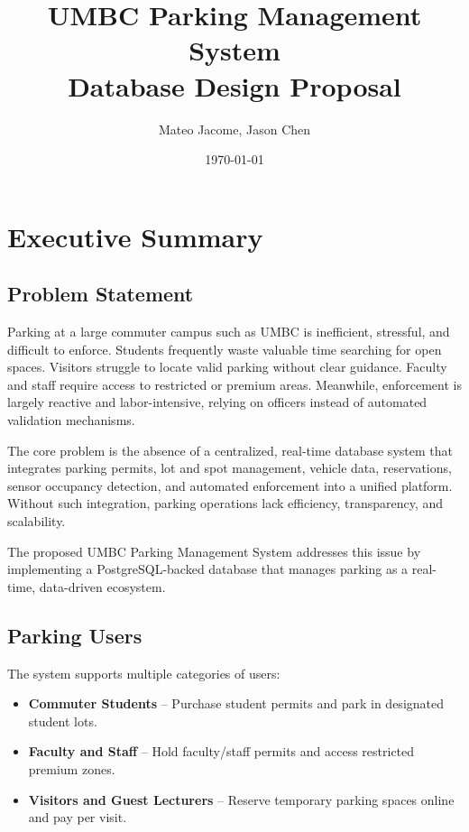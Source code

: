 \documentclass[12pt]{report}
\title{UMBC Parking Management System\\Database Design Proposal}
\author{Mateo Jacome, Jason Chen}
\date{\today}
\begin{document}
\maketitle

\tableofcontents
\newpage

\section{Executive Summary}


\subsection{Problem Statement}

Parking at a large commuter campus such as UMBC is inefficient, stressful, and difficult to enforce. Students frequently waste valuable time searching for open spaces. Visitors struggle to locate valid parking without clear guidance. Faculty and staff require access to restricted or premium areas. Meanwhile, enforcement is largely reactive and labor-intensive, relying on officers instead of automated validation mechanisms.

The core problem is the absence of a centralized, real-time database system that integrates parking permits, lot and spot management, vehicle data, reservations, sensor occupancy detection, and automated enforcement into a unified platform. Without such integration, parking operations lack efficiency, transparency, and scalability.

The proposed UMBC Parking Management System addresses this issue by implementing a PostgreSQL-backed database that manages parking as a real-time, data-driven ecosystem.

\subsection{Parking Users}

The system supports multiple categories of users:

\begin{itemize}
    \item \textbf{Commuter Students} -- Purchase student permits and park in designated student lots.
    \item \textbf{Faculty and Staff} -- Hold faculty/staff permits and access restricted premium zones.
    \item \textbf{Visitors and Guest Lecturers} -- Reserve temporary parking spaces online and pay per visit.
\end{itemize}
\end{document}
